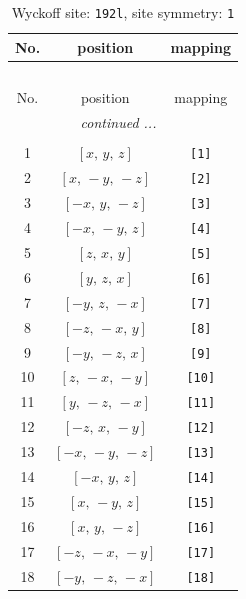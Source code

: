 \documentclass[fleqn,8pt]{jsarticle}
\begin{document}
\begin{longtable}{ccc}
\caption{Wyckoff site: {\tt 192l}, site symmetry: {\tt 1}}
 \\
 \hline \hline
No. & position & mapping \\ \hline \endfirsthead

\multicolumn{2}{l}{\tablename\ \thetable{}} \\
 \hline \hline
No. & position & mapping \\ \hline \endhead

 \hline \hline
\multicolumn{2}{r}{\footnotesize\it continued ...} \\ \endfoot

 \hline \hline
\multicolumn{2}{r}{} \\ \endlastfoot

1 & $\left[ x,\, y,\, z \right]$ & {\tt [1]} \\ \hline
2 & $\left[ x,\, - y,\, - z \right]$ & {\tt [2]} \\ \hline
3 & $\left[ - x,\, y,\, - z \right]$ & {\tt [3]} \\ \hline
4 & $\left[ - x,\, - y,\, z \right]$ & {\tt [4]} \\ \hline
5 & $\left[ z,\, x,\, y \right]$ & {\tt [5]} \\ \hline
6 & $\left[ y,\, z,\, x \right]$ & {\tt [6]} \\ \hline
7 & $\left[ - y,\, z,\, - x \right]$ & {\tt [7]} \\ \hline
8 & $\left[ - z,\, - x,\, y \right]$ & {\tt [8]} \\ \hline
9 & $\left[ - y,\, - z,\, x \right]$ & {\tt [9]} \\ \hline
10 & $\left[ z,\, - x,\, - y \right]$ & {\tt [10]} \\ \hline
11 & $\left[ y,\, - z,\, - x \right]$ & {\tt [11]} \\ \hline
12 & $\left[ - z,\, x,\, - y \right]$ & {\tt [12]} \\ \hline
13 & $\left[ - x,\, - y,\, - z \right]$ & {\tt [13]} \\ \hline
14 & $\left[ - x,\, y,\, z \right]$ & {\tt [14]} \\ \hline
15 & $\left[ x,\, - y,\, z \right]$ & {\tt [15]} \\ \hline
16 & $\left[ x,\, y,\, - z \right]$ & {\tt [16]} \\ \hline
17 & $\left[ - z,\, - x,\, - y \right]$ & {\tt [17]} \\ \hline
18 & $\left[ - y,\, - z,\, - x \right]$ & {\tt [18]} \\ \hline

\end{longtable}
\end{document}
